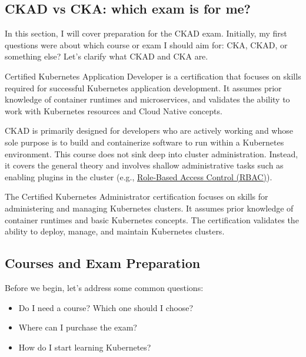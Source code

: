 \subsection{CKAD vs CKA: which exam is for me?}

In this section, I will cover preparation for the CKAD exam. Initially, my first questions were about which course or exam I should aim for: CKA, CKAD, or something else? Let's clarify what CKAD and CKA are.

\begin{definition}[CKAD] 
	Certified Kubernetes Application Developer is a certification that focuses on skills required for successful Kubernetes application development. It assumes prior knowledge of container runtimes and microservices, and validates the ability to work with Kubernetes resources and Cloud Native concepts.~\cite{linuxfoundation-ckad}
\end{definition}

CKAD is primarily designed for developers who are actively working and whose sole purpose is to build and containerize software to run within a Kubernetes environment. This course does not sink deep into cluster administration. Instead, it covers the general theory and involves shallow administrative tasks such as enabling plugins in the cluster (e.g., \href{https://kubernetes.io/docs/reference/access-authn-authz/rbac/}{Role-Based Access Control (RBAC)}).

\begin{definition}[CKA]
	The Certified Kubernetes Administrator certification focuses on skills for administering and managing Kubernetes clusters. It assumes prior knowledge of container runtimes and basic Kubernetes concepts. The certification validates the ability to deploy, manage, and maintain Kubernetes clusters.~\cite{linuxfoundation-cka}
\end{definition}

\subsection{Courses and Exam Preparation}
Before we begin, let's address some common questions:
\begin{itemize}
	\item Do I need a course? Which one should I choose?
	\item Where can I purchase the exam?
	\item How do I start learning Kubernetes?
\end{itemize} 

